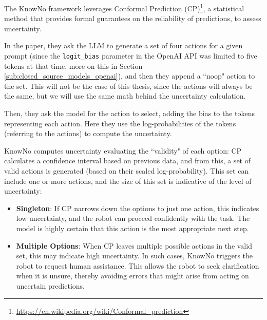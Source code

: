 The KnowNo framework leverages Conformal Prediction (CP)\footnote{\url{https://en.wikipedia.org/wiki/Conformal_prediction}},
a statistical method that provides formal guarantees on the reliability of
predictions, to assess uncertainty.

In the paper, they ask the LLM to generate a set of four actions for a given
prompt (since the \texttt{logit\_bias} parameter in the OpenAI API was limited
to five tokens at that time, more on this in Section \ref{sub:closed_source_models_openai}),
and then they append a ``noop" action to the set. This will not be the case of this
thesis, since the actions will always be the same, but we will use the same math
behind the uncertainty calculation.

Then, they ask the model for the action to select, adding the bias to the tokens
representing each action. Here they use the log-probabilities of the tokens (referring
to the actions) to compute the uncertainty.

KnowNo computes uncertainty evaluating the ``validity" of each option: CP
calculates a confidence interval based on previous data, and from this, a set of
valid actions is generated (based on their scaled log-probability). This set can
include one or more actions, and the size of this set is indicative of the level
of uncertainty:
\begin{itemize}
  \item \textbf{Singleton}: If CP narrows down the options to just one action,
    this indicates low uncertainty, and the robot can proceed confidently with the
    task. The model is highly certain that this action is the most appropriate
    next step.

  \item \textbf{Multiple Options}: When CP leaves multiple possible actions in the
    valid set, this may indicate high uncertainty. In such cases, KnowNo
    triggers the robot to request human assistance. This allows the robot to seek
    clarification when it is unsure, thereby avoiding errors that might arise
    from acting on uncertain predictions.
\end{itemize}

